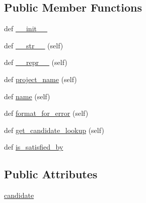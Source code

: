 \subsection*{Public Member Functions}
\begin{DoxyCompactItemize}
\item 
def \hyperlink{classpip_1_1__internal_1_1resolution_1_1resolvelib_1_1requirements_1_1ExplicitRequirement_a0c029134b6c08276b76773f4c9f6ea83}{\+\_\+\+\_\+init\+\_\+\+\_\+}
\item 
def \hyperlink{classpip_1_1__internal_1_1resolution_1_1resolvelib_1_1requirements_1_1ExplicitRequirement_a61ac7626cb37a2a8b8ab6f41cba9ffa3}{\+\_\+\+\_\+str\+\_\+\+\_\+} (self)
\item 
def \hyperlink{classpip_1_1__internal_1_1resolution_1_1resolvelib_1_1requirements_1_1ExplicitRequirement_abd5723206329d8e6c38fba8e1836da3e}{\+\_\+\+\_\+repr\+\_\+\+\_\+} (self)
\item 
def \hyperlink{classpip_1_1__internal_1_1resolution_1_1resolvelib_1_1requirements_1_1ExplicitRequirement_a69d8322d1bb88250df6b7da112fcb30f}{project\+\_\+name} (self)
\item 
def \hyperlink{classpip_1_1__internal_1_1resolution_1_1resolvelib_1_1requirements_1_1ExplicitRequirement_a7250c5e2ac7d7b9c99a42010a3dd1672}{name} (self)
\item 
def \hyperlink{classpip_1_1__internal_1_1resolution_1_1resolvelib_1_1requirements_1_1ExplicitRequirement_ab562f1625be98723e1ff37e121b5c250}{format\+\_\+for\+\_\+error} (self)
\item 
def \hyperlink{classpip_1_1__internal_1_1resolution_1_1resolvelib_1_1requirements_1_1ExplicitRequirement_a13a72e9997d569526a845219be3452c3}{get\+\_\+candidate\+\_\+lookup} (self)
\item 
def \hyperlink{classpip_1_1__internal_1_1resolution_1_1resolvelib_1_1requirements_1_1ExplicitRequirement_a43d9a64dba8dc8d4ad9d8df02e85a6b5}{is\+\_\+satisfied\+\_\+by}
\end{DoxyCompactItemize}
\subsection*{Public Attributes}
\begin{DoxyCompactItemize}
\item 
\hyperlink{classpip_1_1__internal_1_1resolution_1_1resolvelib_1_1requirements_1_1ExplicitRequirement_a9919e92037563e000e8bf377e0fbcc15}{candidate}
\end{DoxyCompactItemize}


